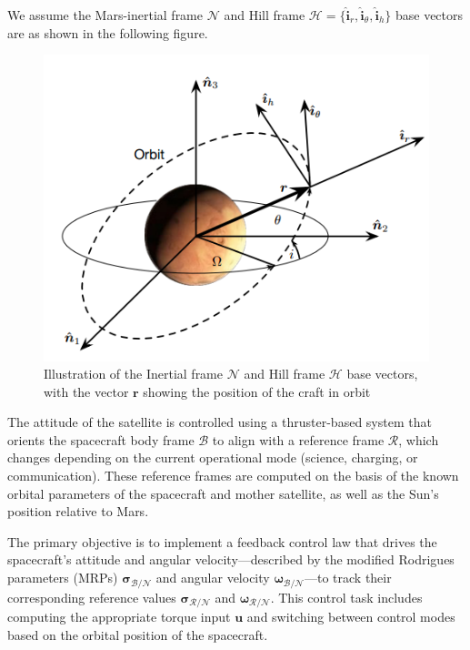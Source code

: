 \documentclass[conf]{new-aiaa}
\begin{document}
We assume the Mars-inertial frame $\mathcal{N}$ and Hill frame $\mathcal{H} = \{\hat{\bm{i}}_r, \hat{\bm{i}}_{\theta}, \hat{\bm{i}}_h\}$ base vectors are as shown in the following figure.\begin{figure}[H]
    \centering
    \captionsetup{width=.7\linewidth}
    \includegraphics[width=.75\linewidth]{fig1.png}
    \caption{Illustration of the Inertial frame $\mathcal{N}$ and Hill frame $\mathcal{H}$ base vectors, with the vector $\bm r$ showing the position of the craft in orbit}
    \label{fig:enter-label}
\end{figure}
The attitude of the satellite is controlled using a thruster-based system that orients the spacecraft body frame $\mathcal{B}$ to align with a reference frame $\mathcal{R}$, which changes depending on the current operational mode (science, charging, or communication). These reference frames are computed on the basis of the known orbital parameters of the spacecraft and mother satellite, as well as the Sun's position relative to Mars.

The primary objective is to implement a feedback control law that drives the spacecraft's attitude and angular velocity---described by the modified Rodrigues parameters (MRPs) $\bm{\sigma}_{\mathcal{B}/\mathcal{N}}$ and angular velocity $\bm{\omega}_{\mathcal{B}/\mathcal{N}}$---to track their corresponding reference values $\bm{\sigma}_{\mathcal{R}/\mathcal{N}}$ and $\bm{\omega}_{\mathcal{R}/\mathcal{N}}$. This control task includes computing the appropriate torque input $\bm{u}$ and switching between control modes based on the orbital position of the spacecraft.
\end{document}
